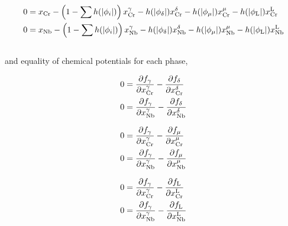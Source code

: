\documentclass[10pt]{article}
\begin{document}
		\begin{align}
			\label{eqn:Jf1}
			0 &= x_{\ce{Cr}} - \left( 1-\sum h(|\phi_i|) \right)x_{\ce{Cr}}^{\gamma}
			                 - h(|\phi_{\delta}|)x_{\ce{Cr}}^{\delta}
			                 - h(|\phi_{\mu}|)x_{\ce{Cr}}^{\mu}
			                 - h(|\phi_{\ce{L}}|)x_{\ce{Cr}}^{\ce{L}}\\
			\label{eqn:Jf2}
			0 &= x_{\ce{Nb}} - \left( 1-\sum h(|\phi_i|) \right)x_{\ce{Nb}}^{\gamma}
			                 - h(|\phi_{\delta}|)x_{\ce{Nb}}^{\delta}
			                 - h(|\phi_{\mu}|)x_{\ce{Nb}}^{\mu}
			                 - h(|\phi_{\ce{L}}|)x_{\ce{Nb}}^{\ce{L}}
		\end{align}\\
		and equality of chemical potentials for each phase,\\
		\begin{minipage}{0.305\textwidth}
		\begin{align}
			\label{eqn:Jf3}
			0 &= \frac{\partial f_{\gamma}}{\partial x_{\ce{Cr}}^{\gamma}} - \frac{\partial f_{\delta}}{\partial x_{\ce{Cr}}^{\delta}}\\
			\label{eqn:Jf4}
			0 &= \frac{\partial f_{\gamma}}{\partial x_{\ce{Nb}}^{\gamma}} - \frac{\partial f_{\delta}}{\partial x_{\ce{Nb}}^{\delta}}
		\end{align}
		\end{minipage}\qquad
		\begin{minipage}{0.305\textwidth}
		\begin{align}
			\label{eqn:Jf5}
			0 &= \frac{\partial f_{\gamma}}{\partial x_{\ce{Cr}}^{\gamma}} - \frac{\partial f_{\mu}}{\partial x_{\ce{Cr}}^{\mu}}\\
			\label{eqn:Jf6}
			0 &= \frac{\partial f_{\gamma}}{\partial x_{\ce{Nb}}^{\gamma}} - \frac{\partial f_{\mu}}{\partial x_{\ce{Nb}}^{\mu}}
		\end{align}
		\end{minipage}\qquad
		\begin{minipage}{0.305\textwidth}
		\begin{align}
			\label{eqn:Jf7}
			0 &= \frac{\partial f_{\gamma}}{\partial x_{\ce{Cr}}^{\gamma}} - \frac{\partial f_{\ce{L}}}{\partial x_{\ce{Cr}}^{\ce{L}}}\\
			\label{eqn:Jf8}
			0 &= \frac{\partial f_{\gamma}}{\partial x_{\ce{Nb}}^{\gamma}} - \frac{\partial f_{\ce{L}}}{\partial x_{\ce{Nb}}^{\ce{L}}}
		\end{align}
		\end{minipage}\\
\end{document}
